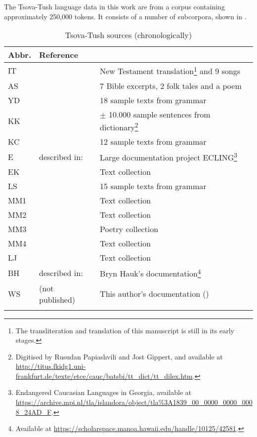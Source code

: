 The Tsova-Tush language data in this work are from a corpus containing approximately 250,000 tokens. It consists of a number of subcorpora, shown in . 

\begin{table}
		\begin{tabularx}{\textwidth}{llQ}
        \lsptoprule
			Abbr. & Reference & \\
			\midrule
			IT & \cite{tsiskarovgloss,tsiskarovbible} & New Testament translation\footnote{The transliteration and translation of this manuscript is still in its early stages.} and 9 songs \\
			AS & \cite{schiefner54,schiefner56, schiefner59} & 7 Bible excerpts, 2 folk tales and a poem \\
			YD & \cite{desheriev53} & 18 sample texts from grammar \\
			KK & \cite{kadkad84} & $\pm$ 10.000 sample sentences from dictionary\footnote{Digitised by Rusudan Papiashvili and Jost Gippert, and available at \url{http://titus.fkidg1.uni-frankfurt.de/texte/etce/cauc/batsbi/tt_dict/tt_dilex.htm}.} \\
			KC & \cite{chrelashvili02} & 12 sample texts from grammar \\
			E & described in: \cite{gippert08} & Large documentation project ECLING\footnote{Endangered Caucasian Languages in Georgia, available at \url{https://archive.mpi.nl/tla/islandora/object/tla\%3A1839\_00\_0000\_0000\_0008\_24AD\_F}.} \\
			EK & \cite{kadagidze09} & Text collection \\
			LS & \cite{sanikidze10} & 15 sample texts from grammar \\
			MM1 & \cite{MM1} & Text collection \\
			MM2 & \cite{MM2} & Text collection \\
			MM3 & \cite{AM} & Poetry collection \\
			MM4 & \cite{MM4} & Text collection \\
			LJ & \cite{jamarishvili} & Text collection \\
			BH & described in: \cite{hauk} & Bryn Hauk's documentation\footnote{Available at \url{https://scholarspace.manoa.hawaii.edu/handle/10125/42581}.} \\
			WS & (not published) & This author's documentation () \\
        \lspbottomrule
		\end{tabularx}
	\caption{Tsova-Tush sources (chronologically)}
	\label{sources-table1}
\end{table}

